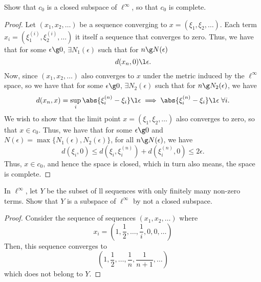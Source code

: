 \begin{question}
    Show that $c_0$ is a closed subspace of $\ell^\infty$, so that $c_0$ is complete.
    \label{section2.3-2}
\end{question}
\begin{proof}
   Let $(x_1 , x_2 , \ldots )$ be a sequence converging to $x = (\xi_1  , \xi_2 , \ldots)$. Each term $x_i = (\xi^{(i)}_1 , \xi^{(i)}_2 , \ldots)$ it itself a sequence that converges to zero. Thus, we have that for some $\epsilon \g 0$, $\exists N_1(\epsilon)$ such that for $n \g  N(\epsilon)$
   \[d(x_n , 0) \l \epsilon.\]
   Now, since $(x_1 , x_2 ,\ldots)$ also converges to $x$ under the metric induced by the $\ell^\infty$ space, so we have that for some $\epsilon \g 0$, $\exists N_2(\epsilon)$ such that for $n \g N_2(\epsilon)$, we have
   \[d(x_n , x) = \sup_{i} \abs{\xi^{(n)}_i  -\xi_i} \l \epsilon \implies  \abs{\xi^{(n)}_i  -\xi_i} \l \epsilon \; \forall i.\]
   We wish to show that the limit point $x = (\xi_1  , \xi_2 , \ldots)$ also converges to zero, so that $x \in c_0$. Thus, we have that for some $\epsilon \g 0$ and $N(\epsilon) = \max\{N_1(\epsilon) , N_2(\epsilon)\}$, for all $n \g N(\epsilon)$, we have
   \[d(\xi_i , 0) \leq d(\xi_i , \xi^{(n)}_i) + d(\xi^{(n)}_i , 0) \leq 2\epsilon.\]
   Thus, $x \in c_0$, and hence the space is closed, which in turn also means, the space is complete.
\end{proof}

\begin{question}
    In $\ell^\infty$, let $Y$ be the subset of ll sequences with only finitely many non-zero terms. Show that $Y$ is a subspace of $\ell^\infty$ by not a closed subspace.
    \label{section2.3-3}
\end{question}
\begin{proof}
    Consider the sequence of sequences $(x_1 , x_2 , \ldots)$ where 
    \[x_i = \left(1 , \frac{1}{2} , \ldots , \frac{1}{i} , 0 , 0 , \ldots \right)\]
    Then, this sequence converges to 
    \[\left(1 , \frac{1}{2} , \ldots , \frac{1}{n} , \frac{1}{n+1} , \ldots \right)\]
    which does not belong to $Y$.
\end{proof}

